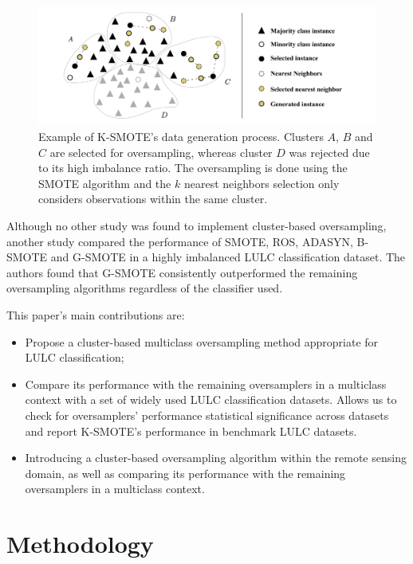 \documentclass[parskip=full]{scrartcl}
\begin{document}
\begin{figure}[H]
	\centering
	\includegraphics[width=1\linewidth]{../analysis/kmeans_smote_example}
	\caption{Example of K-SMOTE's data generation process. Clusters $A$,
		$B$ and $C$ are selected for
		oversampling, whereas cluster $D$ was rejected due to its
		high imbalance ratio. The oversampling is done using the SMOTE algorithm and
		the $k$ nearest neighbors selection only considers
		observations within the same cluster.}
	\label{fig:kmeans_smote_example}
\end{figure}

Although no other study was found to implement cluster-based oversampling,
another study \cite{Douzas2019rs} compared the performance of SMOTE, ROS,
ADASYN, B-SMOTE and G-SMOTE in a highly imbalanced LULC classification dataset.
The authors found that G-SMOTE consistently outperformed the remaining
oversampling algorithms regardless of the classifier used.

This paper's main contributions are:
\begin{itemize}
    \item Propose a cluster-based multiclass oversampling method appropriate
        for LULC classification;
    \item Compare its performance with the remaining oversamplers in a
        multiclass context with a set of widely used LULC classification
        datasets. Allows us to check for oversamplers' performance statistical
        significance across datasets and report K-SMOTE's performance in
        benchmark LULC datasets.
    \item Introducing a cluster-based oversampling algorithm within the remote
        sensing domain, as well as comparing its performance with the remaining
        oversamplers in a multiclass context.
\end{itemize}

\section{Methodology}\label{sec:methodology}
\end{document}
